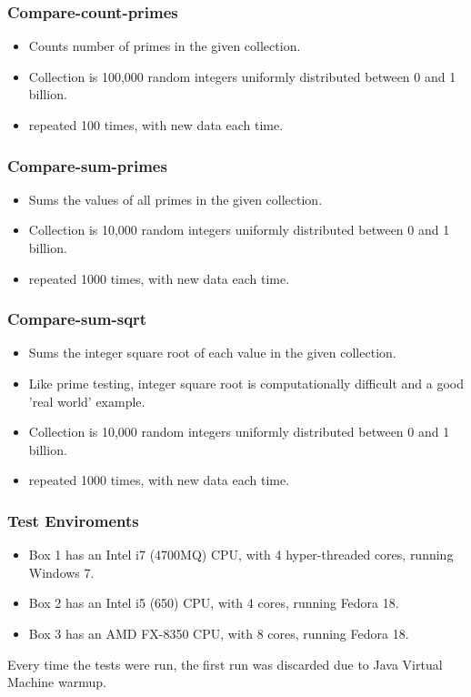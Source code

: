 \documentclass{beamer}
\begin{document}
\begin{frame}
\frametitle{Compare-count-primes}
	\begin{itemize}
	\item Counts number of primes in the given collection.
	\item Collection is 100,000 random integers uniformly distributed between 0 and 1 billion.
	\item repeated 100 times, with new data each time. 
	\end{itemize}
\end{frame}
\begin{frame}
\frametitle{Compare-sum-primes}
	\begin{itemize}
	\item Sums the values of all primes in the given collection.
	\item Collection is 10,000 random integers uniformly distributed between 0 and 1 billion.
	\item repeated 1000 times, with new data each time. 
	\end{itemize}
\end{frame}
\begin{frame}
\frametitle{Compare-sum-sqrt}
	\begin{itemize}
	\item Sums the integer square root of each value in the given collection.
	\item Like prime testing, integer square root is computationally difficult and a good 'real world' example.
	\item Collection is 10,000 random integers uniformly distributed between 0 and 1 billion.
	\item repeated 1000 times, with new data each time. 
	\end{itemize}
\end{frame}
\begin{frame}
\frametitle{Test Enviroments}
\begin{itemize}
 \item Box 1 has an Intel i7 (4700MQ) CPU, with 4 hyper-threaded cores, running Windows 7.
 \item Box 2 has an Intel i5 (650) CPU, with 4 cores, running Fedora 18.
 \item Box 3 has an AMD FX-8350 CPU, with 8 cores, running Fedora 18. 
\end{itemize}
Every time the tests were run, the first run was discarded due to Java Virtual Machine warmup.
\end{frame}
\end{document}
